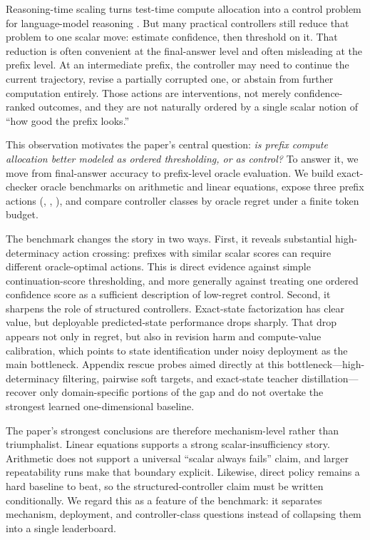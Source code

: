 Reasoning-time scaling turns test-time compute allocation into a control problem for language-model reasoning \citep{wei2022chain,snell2024scaling}.
But many practical controllers still reduce that problem to one scalar move: estimate confidence, then threshold on it.
That reduction is often convenient at the final-answer level and often misleading at the prefix level.
At an intermediate prefix, the controller may need to continue the current trajectory, revise a partially corrupted one, or abstain from further computation entirely.
Those actions are interventions, not merely confidence-ranked outcomes, and they are not naturally ordered by a single scalar notion of ``how good the prefix looks.''

This observation motivates the paper's central question:
\emph{is prefix compute allocation better modeled as ordered thresholding, or as \processstate control?}
To answer it, we move from final-answer accuracy to prefix-level oracle evaluation.
We build exact-checker oracle benchmarks on arithmetic and linear equations, expose three prefix actions (\continue, \revise, \abstain), and compare controller classes by oracle regret under a finite token budget.

The benchmark changes the story in two ways.
First, it reveals substantial high-determinacy action crossing: prefixes with similar scalar scores can require different oracle-optimal actions.
This is direct evidence against simple continuation-score thresholding, and more generally against treating one ordered confidence score as a sufficient description of low-regret control.
Second, it sharpens the role of structured controllers.
Exact-state factorization has clear value, but deployable predicted-state performance drops sharply.
That drop appears not only in regret, but also in revision harm and compute-value calibration, which points to state identification under noisy deployment as the main bottleneck.
Appendix rescue probes aimed directly at this bottleneck---high-determinacy filtering, pairwise soft targets, and exact-state teacher distillation---recover only domain-specific portions of the gap and do not overtake the strongest learned one-dimensional baseline.

The paper's strongest conclusions are therefore mechanism-level rather than triumphalist.
Linear equations supports a strong scalar-insufficiency story.
Arithmetic does not support a universal ``scalar always fails'' claim, and larger repeatability runs make that boundary explicit.
Likewise, direct policy remains a hard baseline to beat, so the structured-controller claim must be written conditionally.
We regard this as a feature of the benchmark: it separates mechanism, deployment, and controller-class questions instead of collapsing them into a single leaderboard.

